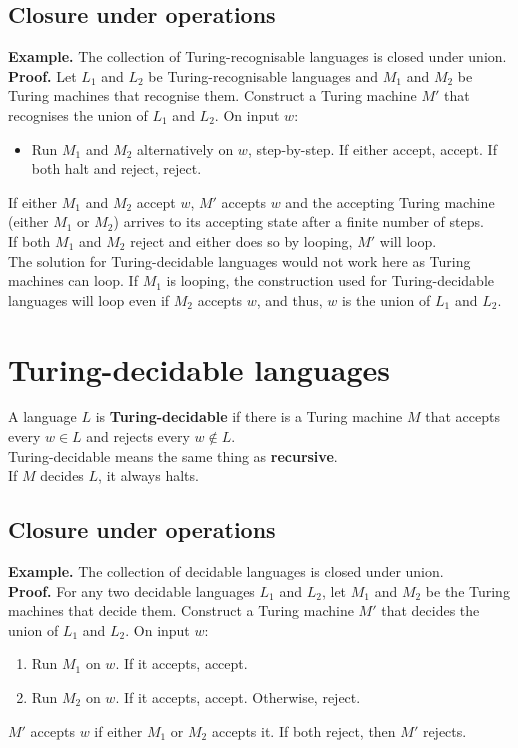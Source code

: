 \documentclass{article}
\begin{document}
\subsection{Closure under operations}
\textbf{Example.} The collection of Turing-recognisable languages is closed under union.
\\\textbf{Proof.} Let $L_1$ and $L_2$ be Turing-recognisable languages and $M_1$ and $M_2$ be Turing machines that recognise them. Construct a Turing machine $M'$ that recognises the union of $L_1$ and $L_2$. On input $w$:
\begin{itemize}
	\item Run $M_1$ and $M_2$ alternatively on $w$, step-by-step. If either accept, accept. If both halt and reject, reject.
\end{itemize}
If either $M_1$ and $M_2$ accept $w$, $M'$ accepts $w$ and the accepting Turing machine (either $M_1$ or $M_2$) arrives to its accepting state after a finite number of steps.\medskip
\\ If both $M_1$ and $M_2$ reject and either does so by looping, $M'$ will loop.
\\ The solution for Turing-decidable languages would not work here as Turing machines can loop. If $M_1$ is looping, the construction used for Turing-decidable languages will loop even if $M_2$ accepts $w$, and thus, $w$ is the union of $L_1$ and $L_2$.

\section{Turing-decidable languages}
A language $L$ is \textbf{Turing-decidable} if there is a Turing machine $M$ that accepts every $w \in L$ and rejects every $w \notin L$.
\\ Turing-decidable means the same thing as \textbf{recursive}.\medskip
\\If $M$ decides $L$, it always halts.

\subsection{Closure under operations}
\textbf{Example.} The collection of decidable languages is closed under union.
\\\textbf{Proof.} For any two decidable languages $L_1$ and $L_2$, let $M_1$ and $M_2$ be the Turing machines that decide them. Construct a Turing machine $M'$ that decides the union of $L_1$ and $L_2$. On input $w$:
\begin{enumerate}
	\item Run $M_1$ on $w$. If it accepts, accept.
	\item Run $M_2$ on $w$. If it accepts, accept. Otherwise, reject.
\end{enumerate}
$M'$ accepts $w$ if either $M_1$ or $M_2$ accepts it. If both reject, then $M'$ rejects.
\end{document}

